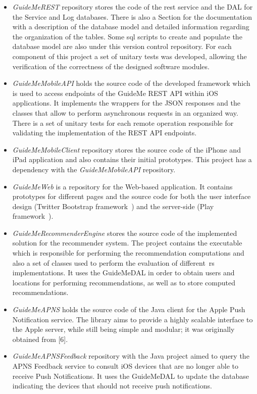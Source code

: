 \begin{itemize}
\item \emph{GuideMeREST} repository stores the code of the \gls{rest} service and the DAL for the Service and Log databases. There is also a Section for the documentation with a description of the database model and detailed information regarding the organization of the tables. Some \gls{sql} scripts to create and populate the database model are also under this version control repository. For each component of this project a set of unitary tests was developed, allowing the verification of the correctness of the designed software modules.
\item \emph{GuideMeMobileAPI} holds the source code of the developed framework which is used to access endpoints of the GuideMe REST API within iOS applications. It implements the wrappers for the JSON responses and the classes that allow to perform asynchronous requests in an organized way. There is a set of unitary tests for each remote operation responsible for validating the implementation of the REST API endpoints.
\item \emph{GuideMeMobileClient} repository stores the source code of the iPhone and iPad application and also contains their initial prototypes. This project has a dependency with the \emph{GuideMeMobileAPI} repository.
\item \emph{GuideMeWeb} is a repository for the Web-based application. It contains prototypes for different pages and the source code for both the user interface design (Twitter Bootstrap framework~\cite{twitterBootstrap}) and the server-side (Play framework~\cite{playFramework}).
\item \emph{GuideMeRecommenderEngine} stores the source code of the implemented solution for the recommender system. The project contains the executable which is responsible for performing the recommendation computations and also a set of classes used to perform the evaluation of different~\gls{rs} implementations. It uses the GuideMeDAL in order to obtain users and locations for performing recommendations, as well as to store computed recommendations.
\item \emph{GuideMeAPNS} holds the source code of the Java client for the Apple Push Notification service. The library aims to provide a highly scalable interface to the Apple server, while still being simple and modular; it was originally obtained from [6].
\item \emph{GuideMeAPNSFeedback} repository with the Java project aimed to query the APNS Feedback service to consult iOS devices that are no longer able to receive Push Notifications. It uses the GuideMeDAL to update the database indicating the devices that should not receive push notifications.
\end{itemize}

